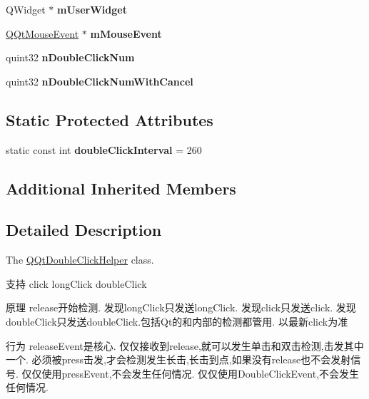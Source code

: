 \begin{DoxyCompactItemize}
Q\+Widget $\ast$ {\bfseries m\+User\+Widget}
\item 
\mbox{\label{class_q_qt_double_click_helper_aae9045b910dbf8a774f4f564be4df8f3}} 
\mbox{\hyperlink{class_q_qt_mouse_event}{Q\+Qt\+Mouse\+Event}} $\ast$ {\bfseries m\+Mouse\+Event}
\item 
\mbox{\label{class_q_qt_double_click_helper_a71ad031e61ebb8024d4d436533e7f0ea}} 
quint32 {\bfseries n\+Double\+Click\+Num}
\item 
\mbox{\label{class_q_qt_double_click_helper_ab661c267e0d25880ec19c0b2a2fbe204}} 
quint32 {\bfseries n\+Double\+Click\+Num\+With\+Cancel}
\end{DoxyCompactItemize}
\subsection*{Static Protected Attributes}
\begin{DoxyCompactItemize}
\item 
\mbox{\label{class_q_qt_double_click_helper_ab52658a4538dbe1f6cbada9de7dcbea9}} 
static const int {\bfseries double\+Click\+Interval} = 260
\end{DoxyCompactItemize}
\subsection*{Additional Inherited Members}


\subsection{Detailed Description}
The \mbox{\hyperlink{class_q_qt_double_click_helper}{Q\+Qt\+Double\+Click\+Helper}} class. 

支持 click long\+Click double\+Click

原理 release开始检测. 发现long\+Click只发送long\+Click. 发现click只发送click. 发现double\+Click只发送double\+Click.\+包括\+Qt的和内部的检测都管用. 以最新click为准

行为 release\+Event是核心. 仅仅接收到release,就可以发生单击和双击检测,击发其中一个. 必须被press击发,才会检测发生长击,长击到点,如果没有release也不会发射信号. 仅仅使用press\+Event,不会发生任何情况. 仅仅使用\+Double\+Click\+Event,不会发生任何情况.

